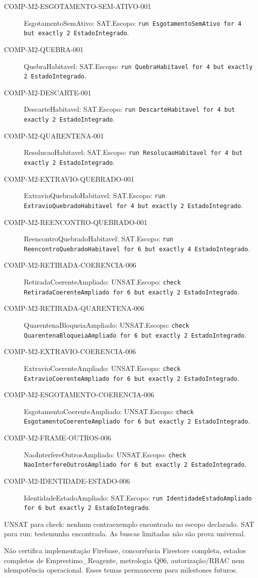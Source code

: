 \begin{description}
\item[COMP-M2-ESGOTAMENTO-SEM-ATIVO-001] EsgotamentoSemAtivo: SAT.\newline Escopo: \texttt{run EsgotamentoSemAtivo for 4 but exactly 2 EstadoIntegrado}.
\item[COMP-M2-QUEBRA-001] QuebraHabitavel: SAT.\newline Escopo: \texttt{run QuebraHabitavel for 4 but exactly 2 EstadoIntegrado}.
\item[COMP-M2-DESCARTE-001] DescarteHabitavel: SAT.\newline Escopo: \texttt{run DescarteHabitavel for 4 but exactly 2 EstadoIntegrado}.
\item[COMP-M2-QUARENTENA-001] ResolucaoHabitavel: SAT.\newline Escopo: \texttt{run ResolucaoHabitavel for 4 but exactly 2 EstadoIntegrado}.
\item[COMP-M2-EXTRAVIO-QUEBRADO-001] ExtravioQuebradoHabitavel: SAT.\newline Escopo: \texttt{run ExtravioQuebradoHabitavel for 4 but exactly 2 EstadoIntegrado}.
\item[COMP-M2-REENCONTRO-QUEBRADO-001] ReencontroQuebradoHabitavel: SAT.\newline Escopo: \texttt{run ReencontroQuebradoHabitavel for 6 but exactly 4 EstadoIntegrado}.
\item[COMP-M2-RETIRADA-COERENCIA-006] RetiradaCoerenteAmpliado: UNSAT.\newline Escopo: \texttt{check RetiradaCoerenteAmpliado for 6 but exactly 2 EstadoIntegrado}.
\item[COMP-M2-RETIRADA-QUARENTENA-006] QuarentenaBloqueiaAmpliado: UNSAT.\newline Escopo: \texttt{check QuarentenaBloqueiaAmpliado for 6 but exactly 2 EstadoIntegrado}.
\item[COMP-M2-EXTRAVIO-COERENCIA-006] ExtravioCoerenteAmpliado: UNSAT.\newline Escopo: \texttt{check ExtravioCoerenteAmpliado for 6 but exactly 2 EstadoIntegrado}.
\item[COMP-M2-ESGOTAMENTO-COERENCIA-006] EsgotamentoCoerenteAmpliado: UNSAT.\newline Escopo: \texttt{check EsgotamentoCoerenteAmpliado for 6 but exactly 2 EstadoIntegrado}.
\item[COMP-M2-FRAME-OUTROS-006] NaoInterfereOutrosAmpliado: UNSAT.\newline Escopo: \texttt{check NaoInterfereOutrosAmpliado for 6 but exactly 2 EstadoIntegrado}.
\item[COMP-M2-IDENTIDADE-ESTADO-006] IdentidadeEstadoAmpliado: SAT.\newline Escopo: \texttt{run IdentidadeEstadoAmpliado for 6 but exactly 2 EstadoIntegrado}.
\end{description}
UNSAT para check: nenhum contraexemplo encontrado no escopo declarado. SAT para run: testemunha encontrada. As buscas limitadas não são prova universal.

Não certifica implementação Firebase, concorrência Firestore completa, estados completos de Emprestimo\_Reagente, metrologia Q06, autorização/RBAC nem idempotência operacional. Esses temas permanecem para milestones futuros.
